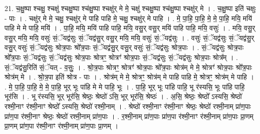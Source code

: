 \documentclass[17pt]{extarticle}
\begin{document}
21. च॒क्षु॒ष्पा श्चक्षु॒ श्चक्षु॑ श्चक्षु॒ष्पा श्च॑क्षु॒ष्पा श्चक्षु॑र् मे मे॒ चक्षु॑ 
श्चक्षु॒ष्पा श्च॑क्षु॒ष्पा श्चक्षु॑र् मे । . च॒क्षु॒ष्पा इति॑ चक्षुः - पाः । . चक्षु॑र् मे मे॒ चक्षु॒ श्चक्षु॑र् मे पाहि पाहि मे॒ चक्षु॒ श्चक्षु॑र् मे पाहि । . मे॒ पा॒हि॒ पा॒हि॒ मे॒ मे॒ पा॒हि॒ मयि॒ मयि॑ पाहि मे मे पाहि॒ मयि॑ । . पा॒हि॒ मयि॒ मयि॑ पाहि पाहि॒ मयि॒ वसु॒र् वसु॒र् मयि॑ पाहि पाहि॒ मयि॒ वसुः॑ । . मयि॒ वसु॒र् वसु॒र् मयि॒ मयि॒ वसुः॑ सं॒ॅयद्व॑सुः सं॒ॅयद्व॑सु॒र् वसु॒र् मयि॒ मयि॒ वसुः॑ सं॒ॅयद्व॑सुः । . वसुः॑ सं॒ॅयद्व॑सुः सं॒ॅयद्व॑सु॒र् वसु॒र् वसुः॑ सं॒ॅयद्व॑सुः श्रोत्र॒पाः श्रो᳚त्र॒पाः सं॒ॅयद्व॑सु॒र् वसु॒र् वसुः॑ सं॒ॅयद्व॑सुः श्रोत्र॒पाः । . सं॒ॅयद्व॑सुः श्रोत्र॒पाः श्रो᳚त्र॒पाः सं॒ॅयद्व॑सुः सं॒ॅयद्व॑सुः श्रोत्र॒पाः श्रोत्रꣳ॒॒ श्रोत्रꣳ॑ श्रोत्र॒पाः सं॒ॅयद्व॑सुः सं॒ॅयद्व॑सुः श्रोत्र॒पाः श्रोत्र᳚म् । . सं॒ॅयद्व॑सु॒रिति॑ सं॒ॅयत् - व॒सुः॒ । . श्रो॒त्र॒पाः श्रोत्रꣳ॒॒ श्रोत्रꣳ॑ श्रोत्र॒पाः श्रो᳚त्र॒पाः श्रोत्र॑म् मे मे॒ श्रोत्रꣳ॑ श्रोत्र॒पाः श्रो᳚त्र॒पाः श्रोत्र॑म् मे । . श्रो॒त्र॒पा इति॑ श्रोत्र - पाः । . श्रोत्र॑म् मे मे॒ श्रोत्रꣳ॒॒ श्रोत्र॑म् मे पाहि पाहि मे॒ श्रोत्रꣳ॒॒ श्रोत्र॑म् मे पाहि । . मे॒ पा॒हि॒ पा॒हि॒ मे॒ मे॒ पा॒हि॒ भूर् भूः पा॑हि मे मे पाहि॒ भूः । . पा॒हि॒ भूर् भूः पा॑हि पाहि॒ भू र॑स्यसि॒ भूः पा॑हि पाहि॒ भूर॑सि । . भू र॑स्यसि॒ भूर् भूर॑सि॒ श्रेष्ठः॒ श्रेष्ठो॑ ऽसि॒ भूर् भूर॑सि॒ श्रेष्ठः॑ । . अ॒सि॒ श्रेष्ठः॒ श्रेष्ठो᳚ ऽस्यसि॒ श्रेष्ठो॑ रश्मी॒नाꣳ र॑श्मी॒नाꣳ श्रेष्ठो᳚ ऽस्यसि॒ श्रेष्ठो॑ रश्मी॒नाम् । . श्रेष्ठो॑ रश्मी॒नाꣳ र॑श्मी॒नाꣳ श्रेष्ठः॒ श्रेष्ठो॑ रश्मी॒नाम् प्रा॑ण॒पाः प्रा॑ण॒पा र॑श्मी॒नाꣳ श्रेष्ठः॒ श्रेष्ठो॑ रश्मी॒नाम् प्रा॑ण॒पाः । . र॒श्मी॒नाम् प्रा॑ण॒पाः प्रा॑ण॒पा र॑श्मी॒नाꣳ र॑श्मी॒नाम् प्रा॑ण॒पाः प्रा॒णम् प्रा॒णम् प्रा॑ण॒पा र॑श्मी॒नाꣳ र॑श्मी॒नाम् प्रा॑ण॒पाः प्रा॒णम् । \newline
\end{document}
